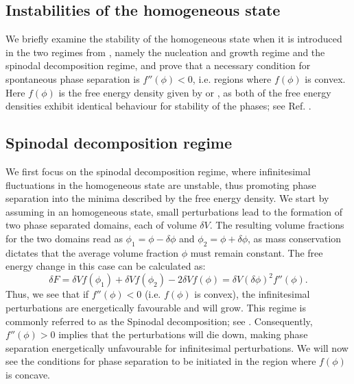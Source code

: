 \begin{appendices}



\chapter{Instabilities of the homogeneous state}

\label{sec:phasesep}

We briefly examine the stability of the homogeneous state when it is introduced in the two regimes from , namely the nucleation and growth regime and the spinodal decomposition regime, and prove that a necessary condition for spontaneous phase separation is $f''(\phi) < 0$, i.e. regions where $f(\phi)$ is convex.
Here $f(\phi)$ is the free energy density given by  or , as both of the free energy densities exhibit identical behaviour for stability of the phases; see Ref. \cite{Review2019}.

\section{Spinodal decomposition regime}

We first focus on the spinodal decomposition regime, where infinitesimal fluctuations in the homogeneous state are unstable, thus promoting phase separation into the minima described by the free energy density. 
We start by assuming in an homogeneous state, small perturbations lead to the formation of two phase separated domains, each of volume $\delta V$.
The resulting volume fractions for the two domains read as $\phi_1 = \phi - \delta \phi$ and $\phi_2 = \phi + \delta \phi$, as mass conservation dictates that the average volume fraction $\phi$ must remain constant.
The free energy change in this case can be calculated as: 
\begin{equation*}
    \delta F = \delta V f(\phi_1) + \delta V f(\phi_2) - 2 \delta V f(\phi) = \delta V (\delta \phi)^2 f''(\phi).
\end{equation*}
Thus, we see that if $f''(\phi) < 0$ (i.e. $f(\phi)$ is convex), the infinitesimal perturbations are energetically favourable and will grow.
This regime is commonly referred to as the Spinodal decomposition; see .
Consequently,  $f''(\phi) > 0$ implies that the perturbations will die down, making phase separation energetically unfavourable for infinitesimal perturbations.
We will now see the conditions for phase separation to be initiated in the region where $f(\phi)$ is concave. 


\end{appendices}
